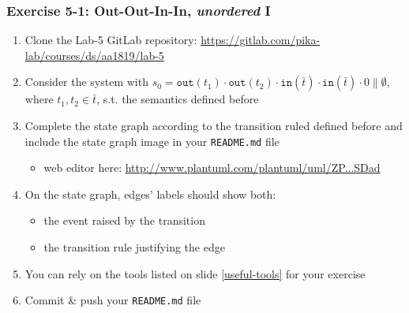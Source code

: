 \documentclass[handout]{beamer}\mode<presentation>{\usetheme{AMSCesenaBleu}}
\begin{document}
\begin{frame}
\frametitle{Exercise 5-1: Out-Out-In-In, \emph{unordered} I}
    \begin{enumerate}
        \item Clone the Lab-5 GitLab repository: \url{https://gitlab.com/pika-lab/courses/ds/aa1819/lab-5}
        
        \vfill
        
        \item Consider the system with \alert{$s_0 = \mathtt{out}(t_1) \cdot \mathtt{out}(t_2) \cdot \mathtt{in}(\bar t) \cdot \mathtt{in}(\bar t) \cdot 0  \parallel \emptyset$}, where $t_1, t_2 \in \bar{t}$, s.t. the \linda{} semantics defined before
        
        \vfill
    
        \item Complete the state graph according to the transition ruled defined before and include the state graph image in your \alert{\texttt{README.md}} file
        \begin{itemize}
            \item web editor here: \href{
                http://www.plantuml.com/plantuml/uml/ZPBVJl8m6CRFUnNl8Nm9P8m_4488-H0JJp0HE48E6bQneMkNjLFHUE22YGVSXWToBIRU0rTYHvakSpWFbhNls-VtF6_JdbJOLu7Ba5nIxc4Vkt12hd30rAdWQaJl2TXMeZbIM95zIwqO0QemetEPhHvYbq1V13ubFhgc3W7YUce53f5pdtgA2euIIXcXuG41_CVpvS8N0NVwWWc_qnbmX_95jmk2qHkITMB2oPsdLyJHfrQ4CN6B7X6Q_fj1gTG5QI63brORHA0AQXS-5Sk7LLWiKrvGx-lllmMxbrVzFIDf6K8b8Rpaq_F9MAzco71DEu-sUOlKkyqMoOg1sctuM6lQsN0qk1ZFlkhL12t3p8PyjyWAITlmQl0xiAhxUQ7rTdlOXliPgWTsQeQuNa_LZPV9SZpo3vUQeJMCoDo-PkxZnytc4QlwNyUAt92iPzFYUYkE42OYn5ODI3t2Ti8ZqzoCPzJDj3hlYapYMDxADZSUnrzXZt0dSDad
            }{http://www.plantuml.com/plantuml/uml/ZP...SDad}
        \end{itemize}
        
        \vfill
        
        \item On the state graph, edges' labels should show both:
        \begin{itemize}
            \item the event raised by the transition
            \item the transition rule justifying the edge
        \end{itemize}
        
        \vfill
        
        \item You can rely on the tools listed on slide \ref{useful-tools} for your exercise
        
        \vfill
        
        \item Commit \& push your \texttt{README.md} file
        
    \end{enumerate}
    
\end{frame}
\end{document}
